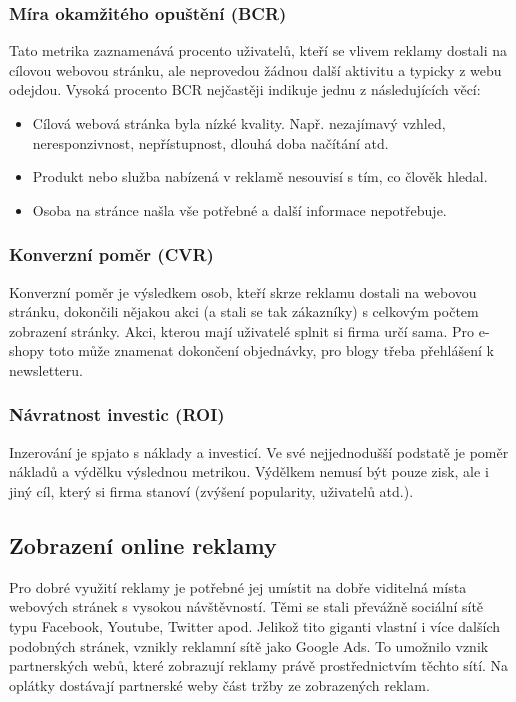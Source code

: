         \subsubsection{Míra okamžitého opuštění (BCR)}
        Tato metrika zaznamenává procento uživatelů, kteří se vlivem reklamy dostali na cílovou webovou stránku, ale neprovedou žádnou další aktivitu a
        typicky z webu odejdou. Vysoká procento BCR nejčastěji indikuje jednu z následujících věcí:
        \begin{itemize}
            \item Cílová webová stránka byla nízké kvality. Např. nezajímavý vzhled, neresponzivnost, nepřístupnost, dlouhá doba načítání atd.
            \item Produkt nebo služba nabízená v reklamě nesouvisí s tím, co člověk hledal.
            \item Osoba na stránce našla vše potřebné a další informace nepotřebuje.
        \end{itemize}

        \subsubsection{Konverzní poměr (CVR)}
        Konverzní poměr je výsledkem osob, kteří skrze reklamu dostali na webovou stránku, dokončili nějakou akci (a stali se tak zákazníky) s
        celkovým počtem zobrazení stránky. Akci, kterou mají uživatelé splnit si firma určí sama. Pro e-shopy toto může znamenat dokončení objednávky,
        pro blogy třeba přehlášení k newsletteru.

        \subsubsection{Návratnost investic (ROI)}
        Inzerování je spjato s náklady a investicí. Ve své nejjednodušší podstatě je poměr nákladů a výdělku výslednou metrikou.
        Výdělkem nemusí být pouze zisk, ale i jiný cíl, který si firma stanoví (zvýšení popularity, uživatelů atd.).

    \subsection{Zobrazení online reklamy}
    Pro dobré využití reklamy je potřebné jej umístit na dobře viditelná místa webových stránek s vysokou návštěvností.
    Těmi se stali převážně sociální sítě typu Facebook, Youtube, Twitter apod. Jelikož tito giganti vlastní i více dalších podobných stránek,
    vznikly reklamní sítě jako Google Ads. To umožnilo vznik partnerských webů, které zobrazují reklamy právě prostřednictvím těchto sítí.
    Na oplátky dostávají partnerské weby část tržby ze zobrazených reklam.

